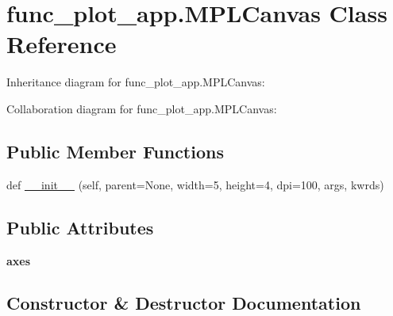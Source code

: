 \hypertarget{classfunc__plot__app_1_1MPLCanvas}{}\section{func\+\_\+plot\+\_\+app.\+M\+P\+L\+Canvas Class Reference}
\label{classfunc__plot__app_1_1MPLCanvas}


Inheritance diagram for func\+\_\+plot\+\_\+app.\+M\+P\+L\+Canvas\+:


Collaboration diagram for func\+\_\+plot\+\_\+app.\+M\+P\+L\+Canvas\+:
\subsection*{Public Member Functions}
\begin{DoxyCompactItemize}
\item 
def \hyperlink{classfunc__plot__app_1_1MPLCanvas_af8df74a738adeb733dfdd7e85d4410c6}{\+\_\+\+\_\+init\+\_\+\+\_\+} (self, parent=None, width=5, height=4, dpi=100, args, kwrds)
\end{DoxyCompactItemize}
\subsection*{Public Attributes}
\begin{DoxyCompactItemize}
\item 
\mbox{\label{classfunc__plot__app_1_1MPLCanvas_a20600d3141312675b3288019bb8bda54}} 
{\bfseries axes}
\end{DoxyCompactItemize}


\subsection{Constructor \& Destructor Documentation}
\mbox{\label{classfunc__plot__app_1_1MPLCanvas_af8df74a738adeb733dfdd7e85d4410c6}} 
